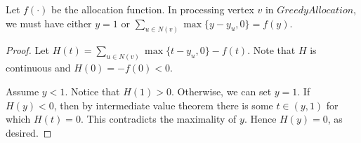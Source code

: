 \documentclass{article}
\begin{document}

%
\begin{lemma}
Let $f(\cdot)$ be the allocation function.
In processing vertex $v$ in $GreedyAllocation$, we must have either $y=1$ or $\sum_{u\in N(v)} \max\{y-y_u,0\}= f(y)$.
\end{lemma}
\begin{proof}
Let $H(t)=\sum_{u\in N(v)}\max\{t-y_{u},0\}- f(t)$. Note that $H$ is continuous and $H(0)=-f(0)<0$.

Assume $y< 1$. Notice that $H(1)>0$. Otherwise, we can set $y=1$. If $H(y) <0$, then by intermediate value theorem there is some $t\in (y,1)$ for which $H(t)=0$. This contradicts the maximality of $y$. Hence $H(y)=0$, as desired.
\end{proof}
\end{document}
